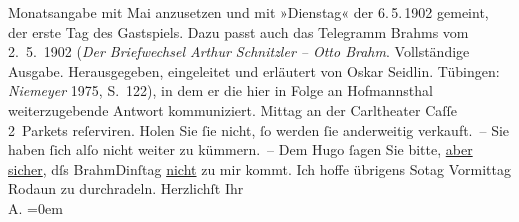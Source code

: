\begin{ledgroupsized}[t]{13cm}
{{{                  Monatsangabe mit Mai anzusetzen und mit »Dienstag« der 6. 5. 1902 gemeint, der erste Tag des
                  Gastspiels. Dazu passt auch das Telegramm Brahms vom 2. 5. 1902 (\emph{Der Briefwechsel Arthur Schnitzler – Otto Brahm}.
                     Vollständige Ausgabe. Herausgegeben, eingeleitet und erläutert von Oskar
                     Seidlin. Tübingen: \emph{Niemeyer}{ }1975, S. 122), in dem er die hier in Folge an Hofmannsthal weiterzugebende Antwort
                  kommuniziert.}}}\label{K_L01217-1h}{ }Mittag an der Carltheater Caſſe
               2 Parkets reſerviren. Holen Sie ſie nicht, ſo werden ſie anderweitig {\pb}verkauft. – Sie haben ſich alſo nicht weiter zu
               kümmern. –\pend
           \pstart
           Dem Hugo ſagen Sie bitte, \uline{aber sicher}, dſs BrahmDinſtag{ }\uline{nicht} zu mir kommt.\pend
           \pstart
           Ich hoffe übrigens So{\geminationn}tag{ }Vormittag{ }Rodaun zu durchradeln.\pend
           \pstart
           Herzlichſt Ihr{\\[\baselineskip]}\spacefill\mbox{A.}\pend
           \leftskip=0em{}
         
         \endnumbering{}\end{ledgroupsized}  \newcommand{\dateiname}{L01217}\newcommand{\titel}{Arthur Schnitzler an Richard Beer-Hofmann, 2. [5.?] 1902}\newcommand{\editorInnen}{Martin Anton Müller und Gerd-Hermann Susen}
      